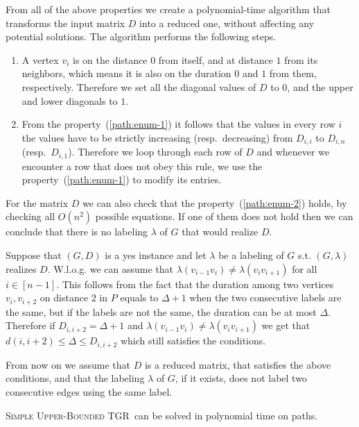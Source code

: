 \documentclass[a4paper,UKenglish,cleveref, autoref, thm-restate]{lipics-v2021}
\newcommand{\deltaUpperBound}{\textsc{Simple Upper-Bounded TGR}}
\begin{document}
From all of the above properties we create a polynomial-time algorithm that transforms the input matrix $D$ into a reduced one, without affecting any potential solutions.
The algorithm performs the following steps.
\begin{enumerate}
    \item A vertex $v_i$ is on the distance $0$ from itself, and at distance $1$ from its neighbors,
    which means it is also on the duration $0$ and $1$ from them, respectively.
    Therefore we set all the diagonal values of $D$ to $0$, and the upper and lower diagonals to $1$.
    \item 
    From the property~(\ref{path:enum-1}) it follows that the values in every row $i$ the values have to be strictly increasing (resp.~decreasing) from $D_{i,i}$ to $D_{i,n}$ (resp.~$D_{i,1}$).
    Therefore we loop through each row of $D$ and whenever we encounter 
    a row that does not obey this rule, we use the property~(\ref{path:enum-1}) to modify its entries.
\end{enumerate}
For the matrix $D$ we can also check that the property~(\ref{path:enum-2}) holds, by checking all $O(n^2)$ possible equations. If one of them does not hold then we can conclude that there is no labeling $\lambda$ of $G$ that would realize $D$.

Suppose that $(G, D)$ is a yes instance and let $\lambda$ be a labeling of $G$ s.t. $(G,\lambda)$ realizes $D$.
W.l.o.g. we can assume that $\lambda(v_{i-1} v_{i}) \neq \lambda (v_{i}v_{i+1})$ for all $i \in [n-1]$.
This follows from the fact that the duration among two vertices $v_i, v_{i+2}$ on distance $2$ in $P$ equals to $\Delta + 1$ when the two consecutive labels are the same, but if the labels are not the same, the duration can be at most $\Delta$.
Therefore if $D_{i,i+2}= \Delta + 1$ and $\lambda(v_{i-1} v_{i}) \neq \lambda (v_{i}v_{i+1})$ we get that $d(i, i+2) \leq \Delta \leq D_{i,i+2}$ which still satisfies the conditions.

From now on we assume that $D$ is a reduced matrix, that satisfies the above conditions, and that the labeling $\lambda$ of $G$, if it exists, does not label two consecutive edges using the same label.

\begin{theorem}\label{thm:paths-upperBound}
	\deltaUpperBound\ can be solved in polynomial time on paths.
\end{theorem}
\end{document}
